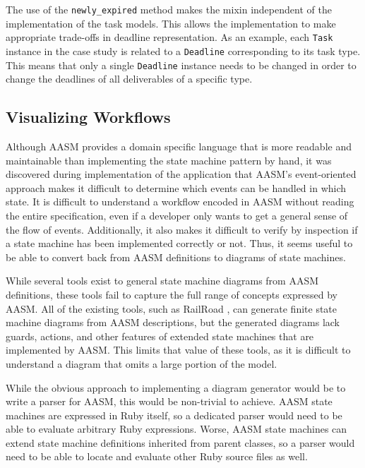 \documentclass[document.tex]{subfiles}
\begin{document}
The use of the \verb!newly_expired! method makes the mixin independent of the implementation of the task models. This allows the implementation to make appropriate trade-offs in deadline representation. As an example, each \verb!Task! instance in the case study is related to a \verb!Deadline! corresponding to its task type. This means that only a single \verb!Deadline! instance needs to be changed in order to change the deadlines of all deliverables of a specific type.

\FloatBarrier


\subsection {Visualizing Workflows}
\label {sec:4ys-visualizing-workflows}

Although AASM provides a domain specific language that is more readable and maintainable than implementing the state machine pattern by hand, it was discovered during implementation of the application that AASM's event-oriented approach makes it difficult to determine which events can be handled in which state. It is difficult to understand a workflow encoded in AASM without reading the entire specification, even if a developer only wants to get a general sense of the flow of events. Additionally, it also makes it difficult to verify by inspection if a state machine has been implemented correctly or not. Thus, it seems useful to be able to convert back from AASM definitions to diagrams of state machines.

While several tools exist to general state machine diagrams from AASM definitions, these tools fail to capture the full range of concepts expressed by AASM. All of the existing tools, such as RailRoad \cite{railroad}, can generate finite state machine diagrams from AASM descriptions, but the generated diagrams lack guards, actions, and other features of extended state machines that are implemented by AASM. This limits that value of these tools, as it is difficult to understand a diagram that omits a large portion of the model.

While the obvious approach to implementing a diagram generator would be to write a parser for AASM, this would be non-trivial to achieve. AASM state machines are expressed in Ruby itself, so a dedicated parser would need to be able to evaluate arbitrary Ruby expressions. Worse, AASM state machines can extend state machine definitions inherited from parent classes, so a parser would need to be able to locate and evaluate other Ruby source files as well.
\end{document}
